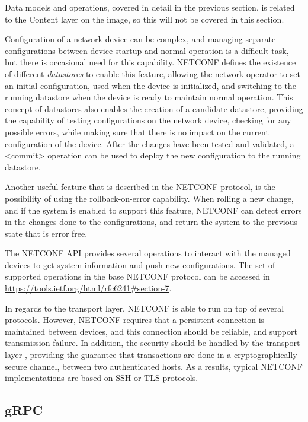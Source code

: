 \par Data models and operations, covered in detail in the previous section, is related to the Content layer on the image, so this will not be covered in this section. 
\par Configuration of a network device can be complex, and managing separate configurations between device startup and normal operation is a difficult task, but there is occasional need for this capability. NETCONF defines the 
existence of different \textit{datastores} to enable this feature, allowing the network operator to set an initial configuration, used when the device is initialized, and switching to the running datastore when the device is ready
to maintain normal operation. This concept of datastores also enables the creation of a candidate datastore, providing the capability of testing configurations on the network device, checking for any possible errors, while making
sure that there is no impact on the current configuration of the device. After the changes have been tested and validated, a <commit> operation can be used to deploy the new configuration to the running datastore.
\par Another useful feature that is described in the NETCONF protocol, is the possibility of using the rollback-on-error capability. When rolling a new change, and if the system is enabled to support this feature,
NETCONF can detect errors in the changes done to the configurations, and return the system to the previous state that is error free. 
\par The NETCONF API provides several operations to interact with the managed devices to get system information and push new configurations. The set of supported operations in the base NETCONF protocol can be accessed in 
\url{https://tools.ietf.org/html/rfc6241#section-7}. 
\par In regards to the transport layer, NETCONF is able to run on top of several protocols. However, NETCONF requires that a persistent connection is maintained between devices, and this connection should be reliable, and support
transmission failure. In addition, the security should be handled by the transport layer \cite { CITE - https://www.ietf.org/slides/slides-edu-netconf-yang-00.pdf}, providing the guarantee that transactions are done in a 
cryptographically secure channel, between two authenticated hosts. As a results, typical NETCONF implementations are based on SSH or TLS protocols.

\subsection {gRPC}  \label {ssec:grpc}

